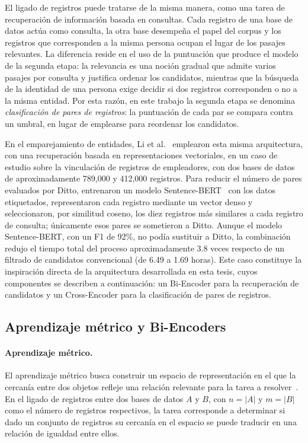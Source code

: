 El ligado de registros puede tratarse de la misma manera, como una tarea de recuperación de información basada en consultas. Cada registro de una base de datos actúa como consulta, la otra base desempeña el papel del corpus y los registros que corresponden a la misma persona ocupan el lugar de los pasajes relevantes. La diferencia reside en el uso de la puntuación que produce el modelo de la segunda etapa: la relevancia es una noción gradual que admite varios pasajes por consulta y justifica ordenar los candidatos, mientras que la búsqueda de la identidad de una persona exige decidir si dos registros corresponden o no a la misma entidad. Por esta razón, en este trabajo la segunda etapa se denomina \textit{clasificación de pares de registros}: la puntuación de cada par se compara contra un umbral, en lugar de emplearse para reordenar los candidatos.

En el emparejamiento de entidades, Li et al.~\cite{li2020} emplearon esta misma arquitectura, con una recuperación basada en representaciones vectoriales, en un caso de estudio sobre la vinculación de registros de empleadores, con dos bases de datos de aproximadamente 789,000 y 412,000 registros. Para reducir el número de pares evaluados por Ditto, entrenaron un modelo Sentence-BERT~\cite{reimers2019} con los datos etiquetados, representaron cada registro mediante un vector denso y seleccionaron, por similitud coseno, los diez registros más similares a cada registro de consulta; únicamente esos pares se sometieron a Ditto. Aunque el modelo Sentence-BERT, con un F1 de 92\%, no podía sustituir a Ditto, la combinación redujo el tiempo total del proceso aproximadamente 3.8 veces respecto de un filtrado de candidatos convencional (de 6.49 a 1.69 horas). Este caso constituye la inspiración directa de la arquitectura desarrollada en esta tesis, cuyos componentes se describen a continuación: un Bi-Encoder para la recuperación de candidatos y un Cross-Encoder para la clasificación de pares de registros.

\subsection{Aprendizaje métrico y Bi-Encoders}

\paragraph{Aprendizaje métrico.}
El aprendizaje métrico busca construir un espacio de representación en el que la cercanía entre dos objetos refleje una relación relevante para la tarea a resolver~\cite{kulis2013}. En el ligado de registros entre dos bases de datos $A$ y $B$, con $n=|A|$ y $m=|B|$ como el número de registros respectivos, la tarea corresponde a determinar si dado un conjunto de registros su cercanía en el espacio se puede traducir en una relación de igualdad entre ellos.

